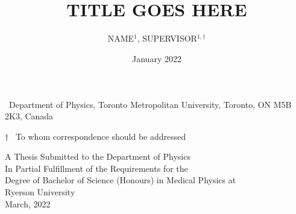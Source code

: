 \title{\\[3em] TITLE GOES HERE}
\author{NAME$^{1}$, SUPERVISOR$^{1, \dagger}$}
\date{January 2022}

\maketitle
\thispagestyle{noNumber}

{\small
\begin{affiliations}
 \item \, Department of Physics, Toronto Metropolitan University, Toronto, ON M5B 2K3, Canada
 \item[$\dagger$] \, To whom correspondence should be addressed
\end{affiliations}
}


\vspace{3em}
\begin{flushright}
\small
A Thesis Submitted to the Department of Physics \\
In Partial Fulfillment of the Requirements for the \\
Degree of Bachelor of Science (Honours) in Medical Physics at \\
Ryerson University \\
March, 2022
\end{flushright}